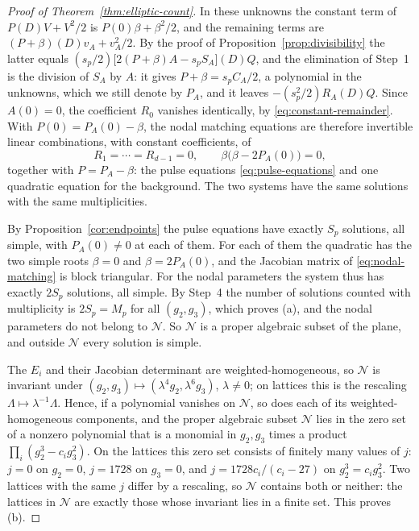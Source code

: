 \begin{proof}[Proof of Theorem~\ref{thm:elliptic-count}]
In these unknowns the constant term of \(P(D)V+V^2/2\) is
\(P(0)\beta+\beta^2/2\), and the remaining terms are
\((P+\beta)(D)v_A+v_A^2/2\). By the proof of
Proposition~\ref{prop:divisibility} the latter equals
\((s_p/2)\bigl[2(P+\beta)A-s_pS_A\bigr](D)Q\), and the elimination of
Step~1 is the division of \(S_A\) by \(A\): it gives
\(P+\beta=s_pC_A/2\), a polynomial in the unknowns, which we still
denote by \(P_A\), and it leaves \(-(s_p^2/2)R_A(D)Q\). Since
\(A(0)=0\), the coefficient \(R_0\) vanishes identically, by
\eqref{eq:constant-remainder}. With \(P(0)=P_A(0)-\beta\), the nodal
matching equations are therefore invertible linear combinations, with
constant coefficients, of
\begin{equation}\label{eq:nodal-matching}
 R_1=\cdots=R_{d-1}=0,\qquad \beta\bigl(\beta-2P_A(0)\bigr)=0,
\end{equation}
together with \(P=P_A-\beta\): the pulse equations
\eqref{eq:pulse-equations} and one quadratic equation for the
background. The two systems have the same solutions with the same
multiplicities.

By Proposition~\ref{cor:endpoints} the pulse equations have exactly
\(S_p\) solutions, all simple, with \(P_A(0)\ne0\) at each of them. For
each of them the quadratic has the two simple roots \(\beta=0\) and
\(\beta=2P_A(0)\), and the Jacobian matrix of \eqref{eq:nodal-matching}
is block triangular. For the nodal parameters the system thus has
exactly \(2S_p\) solutions, all simple. By Step~4 the number of
solutions counted with multiplicity is \(2S_p=M_p\) for all
\((g_2,g_3)\), which proves (a), and the nodal parameters do not belong
to \(\mathcal N\). So \(\mathcal N\) is a proper algebraic subset of the
plane, and outside \(\mathcal N\) every solution is simple.

The \(E_i\) and their Jacobian determinant are weighted-homogeneous, so
\(\mathcal N\) is invariant under
\((g_2,g_3)\mapsto(\lambda^4g_2,\lambda^6g_3)\), \(\lambda\ne0\); on
lattices this is the rescaling \(\Lambda\mapsto\lambda^{-1}\Lambda\).
Hence, if a polynomial vanishes on \(\mathcal N\), so does each of its
weighted-homogeneous components, and the proper algebraic subset
\(\mathcal N\) lies in the zero set of a nonzero polynomial that is a
monomial in \(g_2,g_3\) times a product \(\prod_i(g_2^3-c_ig_3^2)\). On
the lattices this zero set consists of finitely many values of \(j\):
\(j=0\) on \(g_2=0\), \(j=1728\) on \(g_3=0\), and
\(j=1728c_i/(c_i-27)\) on \(g_2^3=c_ig_3^2\). Two lattices with the same
\(j\) differ by a rescaling, so \(\mathcal N\) contains both or neither:
the lattices in \(\mathcal N\) are exactly those whose invariant lies in
a finite set. This proves (b).
\end{proof}

